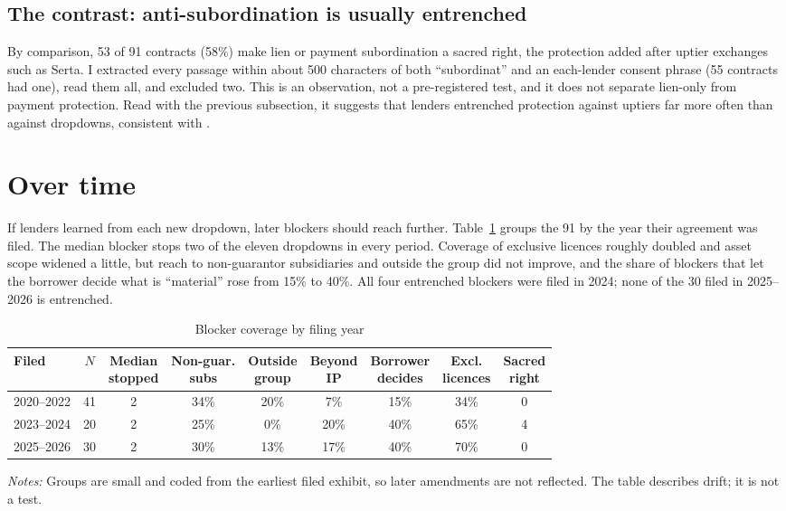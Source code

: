 \documentclass[12pt]{article}
\newcommand{\tabnote}[1]{\par\vspace{3pt}\begin{minipage}{\linewidth}\footnotesize\setstretch{1}\textit{Notes:} #1\end{minipage}}
\begin{document}
\subsection{The contrast: anti-subordination is usually entrenched}
By comparison, 53 of 91 contracts (58\%) make lien or payment subordination a sacred right, the protection added after uptier exchanges such as Serta. I extracted every passage within about 500 characters of both ``subordinat'' and an each-lender consent phrase (55 contracts had one), read them all, and excluded two. This is an observation, not a pre-registered test, and it does not separate lien-only from payment protection. Read with the previous subsection, it suggests that lenders entrenched protection against uptiers far more often than against dropdowns, consistent with \citet{BuccolaNini2024}.

\section{Over time}\label{sec:time}
If lenders learned from each new dropdown, later blockers should reach further. Table~\ref{tab:vintage} groups the 91 by the year their agreement was filed. The median blocker stops two of the eleven dropdowns in every period. Coverage of exclusive licences roughly doubled and asset scope widened a little, but reach to non-guarantor subsidiaries and outside the group did not improve, and the share of blockers that let the borrower decide what is ``material'' rose from 15\% to 40\%. All four entrenched blockers were filed in 2024; none of the 30 filed in 2025--2026 is entrenched.

\begin{table}[!htbp]\centering
\begin{threeparttable}
\caption{Blocker coverage by filing year}\label{tab:vintage}
\small
\begin{tabular}{lcccccccc}
\toprule
Filed & $N$ & \makecell{Median\\stopped} & \makecell{Non-guar.\\subs} & \makecell{Outside\\group} & \makecell{Beyond\\IP} & \makecell{Borrower\\decides} & \makecell{Excl.\\licences} & \makecell{Sacred\\right}\\\midrule
2020--2022 & 41 & 2 & 34\% & 20\% & 7\% & 15\% & 34\% & 0\\
2023--2024 & 20 & 2 & 25\% & 0\% & 20\% & 40\% & 65\% & 4\\
2025--2026 & 30 & 2 & 30\% & 13\% & 17\% & 40\% & 70\% & 0\\
\bottomrule
\end{tabular}
\tabnote{Groups are small and coded from the earliest filed exhibit, so later amendments are not reflected. The table describes drift; it is not a test.}
\end{threeparttable}
\end{table}
\end{document}
